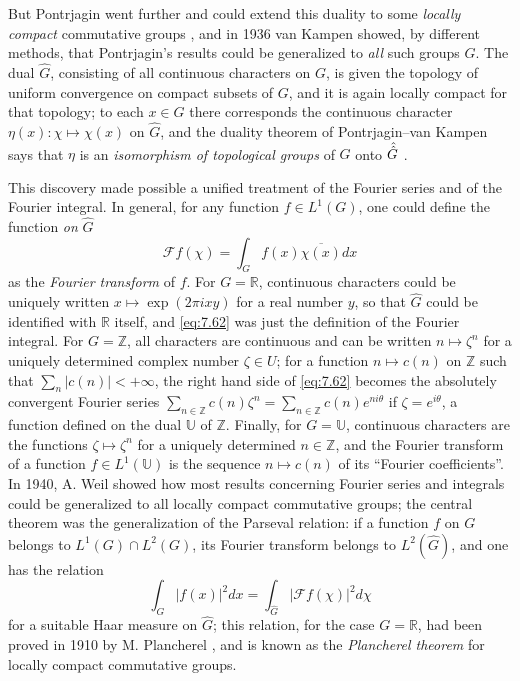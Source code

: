 \documentclass[12pt,a4paper,leqno,twoside]{extbook}
\newcommand{\R}{\mathbb{R}}
\begin{document}
But Pontrjagin went further and could extend this duality to some \emph{locally compact} commutative groups \cite{179}, and in 1936 van Kampen showed, by different methods, that Pontrjagin's results could be generalized to \emph{all} such groups \(G\). The dual \(\hat{G}\), consisting of all continuous characters on \(G\), is given the topology of uniform convergence on compact subsets of \(G\), and it is again locally compact for that topology; to each \(x \in G\) there corresponds the continuous character \(\eta(x): \chi \mapsto \chi(x)\) on \(\hat{G}\), and the duality theorem of Pontrjagin--van Kampen says that \(\eta\) is an \emph{isomorphism of topological groups} of \(G\) onto \(\Hat{\Hat{G}}\) \cite{216}.

This discovery made possible a unified treatment of the Fourier series and of the Fourier integral. In general, for any function \(f \in L^1(G)\), one could define the function \emph{on} \(\hat{G}\)
\begin{equation}
    \label{eq:7.62}
    \mathcal{F}f(\chi) = \int_G f(x)\overline{\chi(x)}dx
\end{equation}
as the \emph{Fourier transform} of \(f\). For \(G = \R\), continuous characters could be uniquely written \(x \mapsto \exp(2\pi ixy)\) for a real number \(y\), so that \(\hat{G}\) could be identified with \(\R\) itself, and \eqref{eq:7.62} was just the definition of the Fourier integral. For \(G = \mathbb{Z}\), all characters are continuous and can be written \(n \mapsto \zeta^n\) for a uniquely determined complex number \(\zeta \in U\); for a function \(n \mapsto c(n)\) on \(\mathbb{Z}\) such that \(\sum\limits_n |c(n)| < +\infty\), the right hand side of \eqref{eq:7.62} becomes the absolutely convergent Fourier series \(\sum\limits_{n \in \mathbb{Z}} c(n)\zeta^n = \sum\limits_{n \in \mathbb{Z}} c(n)e^{ni\theta}\) if \(\zeta = e^{i\theta}\), a function defined on the dual \(\mathbb{U}\) of \(\mathbb{Z}\). Finally, for \(G = \mathbb{U}\), continuous characters are the functions \(\zeta \mapsto \zeta^n\) for a uniquely determined \(n \in \mathbb{Z}\), and the Fourier transform of a function \(f \in L^1(\mathbb{U})\) is the sequence \(n \mapsto c(n)\) of its ``Fourier coefficients''. In 1940, A. Weil \cite{226} showed how most results concerning Fourier series and integrals could be generalized to all locally compact commutative groups; the central theorem was the generalization of the Parseval relation: if a function \(f\) on \(G\) belongs to \(L^1(G) \cap L^2(G)\), its Fourier transform belongs to \(L^2(\hat{G})\), and one has the relation
\begin{equation}
    \label{eq:7.63}
    \int_G |f(x)|^2 dx = \int_{\hat{G}} |\mathcal{F}f(\chi)|^2 d\chi
\end{equation}
for a suitable Haar measure on \(\hat{G}\); this relation, for the case \(G = \R\), had been proved in 1910 by M. Plancherel \cite{174}, and is known as the \emph{Plancherel theorem} for locally compact commutative groups.
\end{document}
